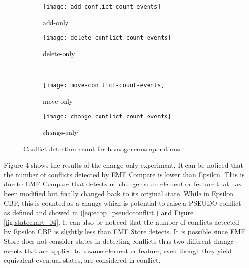 \begin{figure*}[ht]
  \centering
  \begin{subfigure}[t]{0.495\linewidth}
    \texttt{[image: add-conflict-count-events]}
    \caption{add-only}
    \label{fig:add-conflict-count-events}
  \end{subfigure}
  \hfill
  \begin{subfigure}[t]{0.495\linewidth}
    \texttt{[image: delete-conflict-count-events]}
    \caption{delete-only}
    \label{fig:delete-conflict-count-events}
  \end{subfigure}
  \\
  \begin{subfigure}[t]{0.495\linewidth}
    \texttt{[image: move-conflict-count-events]}
    \caption{move-only}
    \label{fig:move-conflict-count-events}
  \end{subfigure}
  \hfill
  \begin{subfigure}[t]{0.495\linewidth}
    \texttt{[image: change-conflict-count-events]}
    \caption{change-only}
    \label{fig:change-conflict-count-events}
  \end{subfigure}
  \caption{Conflict detection count for homogeneous operations.}
  \label{fig:homgeneous_operation_count_events}
\end{figure*}

Figure \ref{fig:change-conflict-count-events} shows the results of the change-only experiment. It can be noticed that the number of conflicts detected by EMF Compare is lower than Epsilon. This is due to EMF Compare that detects no change on an element or feature that has been modified but finally changed back to its original state. While in Epsilon CBP, this is counted as a change which is potential to raise a {PSEUDO} conflict as defined and showed in (\ref{eq:ecbp_pseudoconflict}) and Figure \ref{fig:statechart_04}. It can also be noticed that the number of conflicts detected by Epsilon CBP is slightly less than EMF Store detects. It is possible since EMF Store does not consider states in detecting conflicts thus two different change events that are applied to a same element or feature, even though they yield equivalent eventual states, are considered in conflict.

